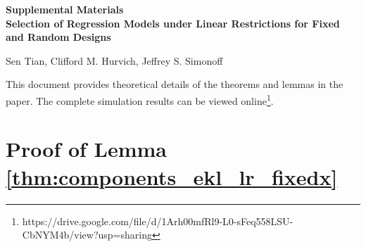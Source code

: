 \beginsupplement
\appendix
{}
\begin{center}
\textbf{\large Supplemental Materials \\
Selection of Regression Models under Linear Restrictions for Fixed and Random Designs}

Sen Tian, Clifford M. Hurvich, Jeffrey S. Simonoff
\end{center}

This document provides theoretical details of the theorems and lemmas in the paper. The complete simulation results can be viewed online\footnote{https://drive.google.com/file/d/1Arh00mfRl9-L0-sFeq558LSU-CbNYM4b/view?usp=sharing}.




\section{Proof of Lemma \ref{thm:components_ekl_lr_fixedx}}
